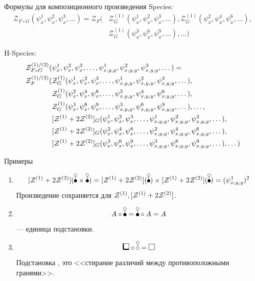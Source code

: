 \documentclass{beamer}
\begin{document}
\begin{frame}{Формулы для композиционного произведения}
Species:
\begin{equation*}
\begin{split}
	\mathcal Z_{F \circ G} (\psi_x^1, \psi_x^2, \psi_x^3, \dots ) = \mathcal Z_F(
		&\mathcal Z^{(1)}_G(\psi_x^1, \psi_x^2, \psi_x^3, \dots), 
		\mathcal Z^{(1)}_G(\psi_x^2, \psi_x^4, \psi_x^6, \dots), \\ 
		&\mathcal Z^{(1)}_G(\psi_x^3, \psi_x^6, \psi_x^9, \dots), 
		\dots)
\end{split}
\end{equation*}

H-Species:
\begin{equation*}
\begin{split}
	\mathcal Z^{(1)/(2)}_{F \circ G} (&\psi_x^1, \psi_x^2, \psi_x^3, \dots, 
	\psi_{x,y,y}^1, \psi_{x,y,y}^2, \psi_{x,y,y}^3, \dots) = \\
	\mathcal Z_F^{(1)/(2)}(
		&\mathcal Z^{(1)}_G(\psi_x^1, \psi_x^2, \psi_x^3, \dots, 
					 \psi_{x, y, y}^1, \psi_{x, y, y}^2, \psi_{x, y, y}^3, \dots), \\
		&\mathcal Z^{(1)}_G(\psi_x^2, \psi_x^4, \psi_x^6, \dots, 
					 \psi_{x, y, y}^2, \psi_{x, y, y}^4, \psi_{x, y, y}^6, \dots), \\
		&\mathcal Z^{(1)}_G(\psi_x^3, \psi_x^6, \psi_x^9, \dots, 
					 \psi_{x, y, y}^3, \psi_{x, y, y}^6, \psi_{x, y, y}^9, \dots), \dots, \\
		&[\mathcal Z^{(1)} + 2\mathcal Z^{(2)}]_G(\psi_x^1, \psi_x^2, \psi_x^3, \dots, 
					 \psi_{x,y,y}^1, \psi_{x,y,y}^2, \psi_{x,y,y}^3, \dots), \\
		&[\mathcal Z^{(1)} + 2\mathcal Z^{(2)}]_G(\psi_x^2, \psi_x^4, \psi_x^6, \dots, 
					 \psi_{x,y,y}^2, \psi_{x,y,y}^4, \psi_{x,y,y}^6, \dots), \\
		&[\mathcal Z^{(1)} + 2\mathcal Z^{(2)}]_G(\psi_x^3, \psi_x^6, \psi_x^9, \dots, 
					 \psi_{x,y,y}^3, \psi_{x,y,y}^6, \psi_{x,y,y}^9, \dots), \dots
	)
\end{split}	
\end{equation*}
\end{frame}

\begin{frame}{Примеры}
\begin{enumerate}[(1)]
\item
$$
\Zfull(\dB \times \dB) = \Zfull(\dB) \times \Zfull(\dB) =(\psi_{x, y, y}^1)^2
$$
Произведение сохраняется для $\mathcal Z^{(1)}, [\mathcal Z^{(1)} + 2\mathcal Z^{(2)}]$.
\item
$$A \circ \dB = \dB \circ A = A$$
\dB --- единица подстановки.
\item
$$\dBB \circ \dA = \dAA$$
Подстановка \dA, это <<стирание различий между противоположными
гранями>>.
\end{enumerate}
\end{frame}
\end{document}
